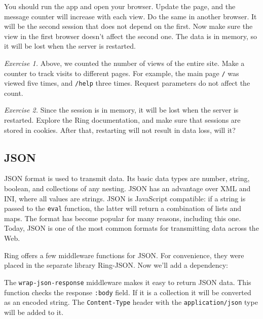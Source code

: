 You should run the app and open your browser. Update the page, and the message counter will increase with each view. Do the same in another browser. It will be the second session that does not depend on the first. Now make sure the view in the first browser doesn't affect the second one. The data is in memory, so it will be lost when the server is restarted.

\emph{Exercise 1.} Above, we counted the number of views of the entire site. Make a counter to track visits to different pages. For example, the main page \verb|/| was
viewed five times, and \verb|/help| three times. Request parameters do not affect the count.

\emph{Exercise 2.} Since the session is in memory, it will be lost when the server is restarted. Explore the Ring documentation, and make sure that sessions are stored in cookies. After that, restarting will not result in data loss, will it?

\subsection{JSON}


JSON format is used to transmit data. Its basic data types are number, string, boolean, and collections of any nesting. JSON has an advantage over XML and INI, where all values are strings. JSON is JavaScript compatible: if a string is passed to the \verb|eval| function, the latter will return a combination of lists and maps. The format has become popular for many reasons, including this one. Today, JSON is one of the most common formats for transmitting data across the Web.

Ring offers a few middleware functions for JSON. For convenience, they were placed in the separate library Ring-JSON. Now we'll add a dependency:

\begin{english}
\begin{clojure}
\end{clojure}
\end{english}


The \verb|wrap-json-response| middleware makes it easy to return JSON data. This function checks the response \verb|:body| field. If it is a collection it will be converted as an encoded string. The \verb|Content-Type| header with the \verb|application/json| type will be added to it.

